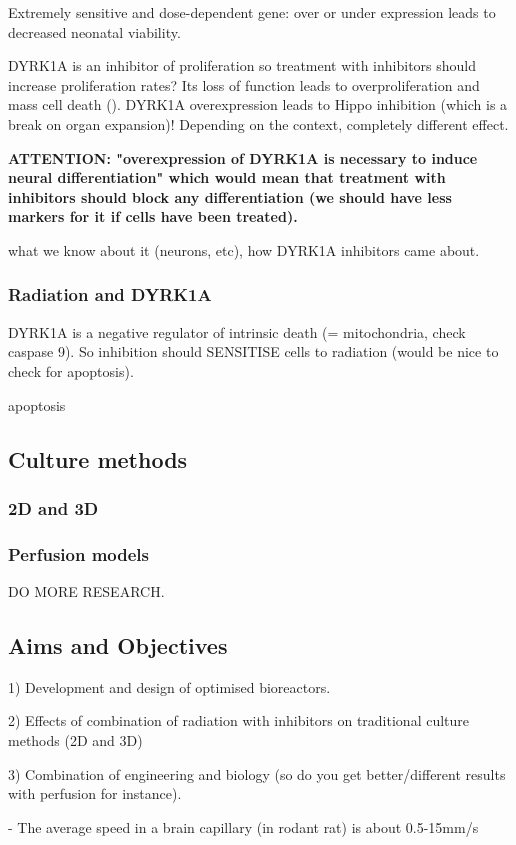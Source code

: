 \documentclass[onecolumn,10pt]{asme2ej}
\begin{document}
Extremely sensitive and dose-dependent gene: over or under expression leads to decreased neonatal viability.  

DYRK1A is an inhibitor of proliferation so treatment with inhibitors should increase proliferation rates? 
Its loss of function leads to overproliferation and mass cell death (\cite{FernAndez-Martinez}).
DYRK1A overexpression leads to Hippo inhibition (which is a break on organ expansion)! Depending on the context, completely different effect.

\textbf{ATTENTION: "overexpression of DYRK1A is necessary to induce neural differentiation" which would mean that treatment with inhibitors should block any differentiation (we should have less markers for it if cells have been treated).} 

what we know about it (neurons, etc), how DYRK1A inhibitors came about.
\subsubsection{Radiation and DYRK1A}
DYRK1A is a negative regulator of intrinsic death (= mitochondria, check caspase 9). So inhibition should SENSITISE cells to radiation (would be nice to check for apoptosis). 


apoptosis
\subsection{Culture methods}
\subsubsection{2D and 3D}
\subsubsection{Perfusion models}
DO MORE RESEARCH.

\subsection{Aims and Objectives}

1) Development and design of optimised bioreactors.

2) Effects of combination of radiation with inhibitors on traditional culture methods (2D and 3D)

3) Combination of engineering and biology (so do you get better/different results with perfusion for instance). 

- %
The average speed in a brain capillary (in rodant rat) is about 0.5-15mm/s
\end{document}
